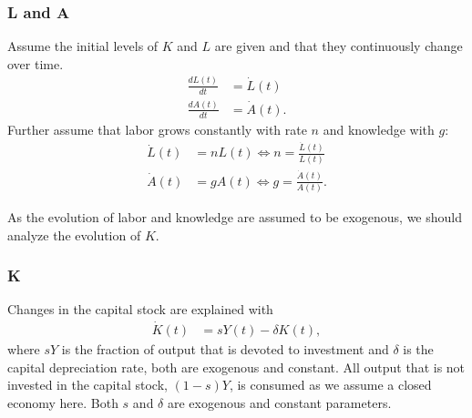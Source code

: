 \subsubsection{L and A}
Assume the initial levels of $K$ and $L$ are given and that they continuously change over time.
\begin{align}
	\frac{d L(t)}{d t}&=\dot{L}(t)\\
	\frac{d A(t)}{d t}&=\dot{A}(t).
\end{align}
Further assume that labor grows constantly with rate $n$ and knowledge with $g$:
\begin{align}
	\dot{L}(t)&=nL(t) \Leftrightarrow n=\frac{\dot L(t)}{L(t)}\\
\dot{A}(t)&=gA(t) \Leftrightarrow g=\frac{\dot A(t)}{A(t)}.
\end{align}

As the evolution of labor and knowledge are assumed to be exogenous, we should analyze the evolution of $K$.

\pbn
\subsubsection{K}
Changes in the capital stock are explained with
\begin{align}
	\dot{K}(t)&=sY(t)-\delta K(t),\label{eq:Kdot}
\end{align}
where $sY$ is the fraction of output that is devoted to investment and $\delta$ is the capital depreciation rate, both are exogenous and constant. All output that is not invested in the capital stock, $(1-s)Y$, is consumed as we assume a closed economy here. Both $s$ and $\delta$ are exogenous and constant parameters. 

\pbn
